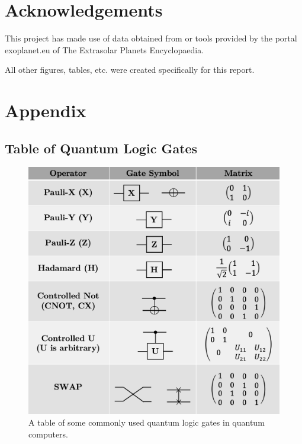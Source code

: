 \documentclass{article}[11pt]
\begin{document}
\pagebreak
\section{Acknowledgements}
This project has made use of data obtained from or tools provided by the portal exoplanet.eu of The Extrasolar Planets Encyclopaedia.



\vspace{0.3cm}
All other figures, tables, etc. were created specifically for this report.


\pagebreak
\appendix
\section{Appendix}\label{section:appendix}
\subsection{Table of Quantum Logic Gates}\label{appendix:tablegates} 
\begin{figure}[H]
    \centering
    \includegraphics[width=\textwidth]{Pictures/quantumgates.png}
    \caption{A table of some commonly used quantum logic gates in quantum computers.\cite{nielsenChuang,candela,gate_table}}
    \label{fig:f}
\end{figure}
\end{document}
